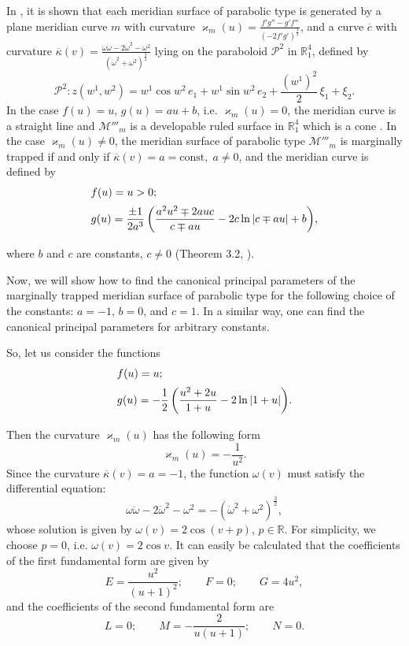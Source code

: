 \documentclass[12pt]{amsart}
\newcommand{\R}{\mathbb R}
\newcommand{\const}{\mathrm{const}}
\theoremstyle{definition}
\theoremstyle{remark}
\newcommand{\ds}{\displaystyle}
\numberwithin{equation}{section}
\begin{document}
In \cite{G-M-IJGMMP-2013}, it is shown that each meridian surface of parabolic type is generated by a plane meridian curve $m$ with curvature  
$\varkappa_m(u) = \ds{ \frac{f' g'' - g' f''}{(-2 f' g')^{\frac{3}{2}}}}$, and a curve $\overline{c}$ with curvature  $\overline{\kappa}(v) = \ds{\frac{\omega \ddot{\omega} - 2 \dot{\omega}^2 - \omega^2 }{(\dot{\omega} ^2 + \omega^2)^{\frac{3}{2}}}}$ lying on the paraboloid  $\mathcal{P}^2$ in $\R^4_1$,
defined by
$$\mathcal{P}^2: z(w^1,w^2) =  w^1 \cos w^2 \,e_1 +   w^1 \sin w^2 \,e_2+ \frac{(w^1)^2}{2} \, \xi_1 + \xi_2.$$
In the case  $f(u)=u$, $g(u)=au+b$, i.e. $\varkappa_m(u) =0$, the meridian curve is a straight line and $\mathcal{M}'''_m$ is a developable ruled  surface in $\R^4_1$ which is a cone \cite{G-M-IJGMMP-2013}. In the case $\varkappa_m(u) \neq 0$, the meridian surface of parabolic type $\mathcal{M}'''_m$
	is marginally trapped if and only if
	$\overline{\kappa}(v) = a = \const, \; a \neq 0$, and the
	meridian curve is defined by
	\begin{equation}  \notag
		\begin{array}{l}
			\vspace{2mm}
			f(u) = u>0;\\
			\vspace{2mm}
			g(u) = \ds{\frac{\pm 1}{2a^3}\left(\frac{a^2 u^2 \mp 2 auc}{c \mp au} -2c \ln |c\mp au| + b \right)},
		\end{array}
	\end{equation}
	where $b$ and $c$ are constants, $c \neq 0$ (Theorem 3.2,  \cite{G-M-IJGMMP-2013}).
	
	\vskip 2mm
	Now, we will show how to find the canonical principal parameters of the marginally trapped meridian surface of parabolic type for the following choice of the constants: $a= -1$, $b=0$,  and $c=1$. In a similar way, one can find the canonical principal parameters for arbitrary constants. 

So, let us consider the functions
\begin{equation*}  
		\begin{array}{l}
			\vspace{2mm}
			f(u) = u;\\
			\vspace{2mm}
			g(u) = \ds{-\frac{1}{2}\left(\frac{u^2 +2 u}{1+u} -2 \ln |1+u| \right)}.
		\end{array}
	\end{equation*}
Then the curvature $\varkappa_m(u)$ has the following form
$$\varkappa_m(u) = -\ds{\frac{1}{u^2}}.$$
Since the curvature $\overline{\kappa}(v) = a = -1$, the function  $\omega(v)$ must satisfy the differential equation:
$$\omega \ddot{\omega} - 2 \dot{\omega}^2 - \omega^2 = - (\dot{\omega} ^2 + \omega^2)^{\frac{3}{2}},$$
whose solution is given by  $\omega(v)=2\cos(v+p)$, $p\in\mathbb{R}$. For simplicity, we choose $p=0$, i.e. $\omega(v)=2\cos v$.
It can easily be calculated that the coefficients of the first fundamental form are given by  
\begin{equation*}
	E = \frac{u^2}{(u+1)^2}; \qquad F =0; \qquad G =4u^2,
\end{equation*}
and the coefficients of the second fundamental form are 
$$L=0; \qquad M=-\frac{2}{u(u+1)}; \qquad N=0. $$
\end{document}
